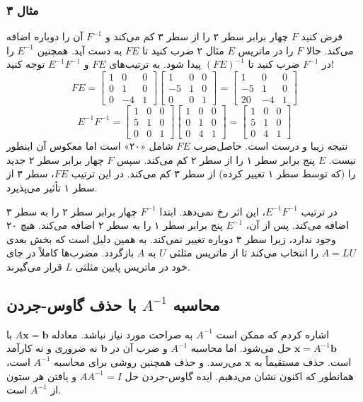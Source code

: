 \documentclass[12pt, a4paper]{book}
\begin{document}
	\subsubsection*{مثال ۳}
	فرض کنید $F$ چهار برابر سطر ۲ را از سطر ۳ کم می‌کند و $F^{-1}$ آن را دوباره اضافه می‌کند. حالا $F$ را در ماتریس $E$ مثال ۲ ضرب کنید تا $FE$ به دست آید. همچنین $E^{-1}$ را در $F^{-1}$ ضرب کنید تا $(FE)^{-1}$ پیدا شود. به ترتیب‌های $FE$ و $E^{-1}F^{-1}$ توجه کنید!
	\[
	FE = \begin{bmatrix} 1 & 0 & 0 \\ 0 & 1 & 0 \\ 0 & -4 & 1 \end{bmatrix}
	\begin{bmatrix} 1 & 0 & 0 \\ -5 & 1 & 0 \\ 0 & 0 & 1 \end{bmatrix}
	= \begin{bmatrix} 1 & 0 & 0 \\ -5 & 1 & 0 \\ 20 & -4 & 1 \end{bmatrix}
	\]
	\[
	E^{-1}F^{-1} = \begin{bmatrix} 1 & 0 & 0 \\ 5 & 1 & 0 \\ 0 & 0 & 1 \end{bmatrix}
	\begin{bmatrix} 1 & 0 & 0 \\ 0 & 1 & 0 \\ 0 & 4 & 1 \end{bmatrix}
	= \begin{bmatrix} 1 & 0 & 0 \\ 5 & 1 & 0 \\ 0 & 4 & 1 \end{bmatrix}
	\]
	نتیجه زیبا و درست است. حاصل‌ضرب $FE$ شامل «۲۰» است اما معکوس آن اینطور نیست. $E$ پنج برابر سطر ۱ را از سطر ۲ کم می‌کند. سپس $F$ چهار برابر سطر ۲ جدید را (که توسط سطر ۱ تغییر کرده) از سطر ۳ کم می‌کند. در این ترتیب $FE$، سطر ۳ از سطر ۱ تأثیر می‌پذیرد.
	
	در ترتیب $E^{-1}F^{-1}$، این اثر رخ نمی‌دهد. ابتدا $F^{-1}$ چهار برابر سطر ۲ را به سطر ۳ اضافه می‌کند. پس از آن، $E^{-1}$ پنج برابر سطر ۱ را به سطر ۲ اضافه می‌کند. هیچ ۲۰ وجود ندارد، زیرا سطر ۳ دوباره تغییر نمی‌کند. به همین دلیل است که بخش بعدی $A=LU$ را انتخاب می‌کند تا از ماتریس مثلثی $U$ به $A$ بازگردد. مضرب‌ها کاملاً در جای خود در ماتریس پایین مثلثی $L$ قرار می‌گیرند.
	
	\subsection*{محاسبه $A^{-1}$ با حذف گاوس-جردن}
	اشاره کردم که ممکن است $A^{-1}$ به صراحت مورد نیاز نباشد. معادله $A\mathbf{x}=\mathbf{b}$ با $\mathbf{x}=A^{-1}\mathbf{b}$ حل می‌شود. اما محاسبه $A^{-1}$ و ضرب آن در $\mathbf{b}$ نه ضروری و نه کارآمد است. حذف مستقیماً به $\mathbf{x}$ می‌رسد. و حذف همچنین روشی برای محاسبه $A^{-1}$ است، همانطور که اکنون نشان می‌دهیم. ایده گاوس-جردن حل $AA^{-1}=I$ و یافتن هر ستون از $A^{-1}$ است.
	
\end{document}
